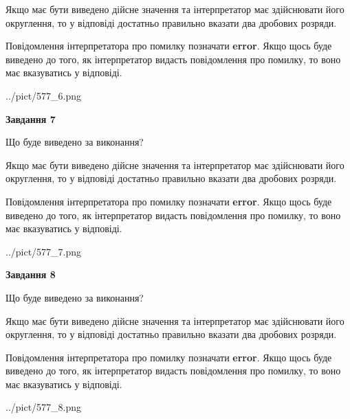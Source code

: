 \documentclass[12pt, ukrainian]{article}
\begin{document}
{\begin {Large}
Якщо має бути виведено дійсне значення та інтерпретатор має здійснювати його округлення, 
то у відповіді достатньо правильно вказати два дробових розряди.

Повідомлення інтерпретатора про помилку позначати \textbf{error}.
Якщо щось буде виведено до того, як інтерпретатор видасть повідомлення про помилку, 
то воно має вказуватись у відповіді. \par

\begin{center}
	{../pict/577_6.png}
\end{center}
\newpage

{\begin {center}\textbf{Завдання 7}\end {center}}\par
Що буде виведено за виконання? \par

Якщо має бути виведено дійсне значення та інтерпретатор має здійснювати його округлення, 
то у відповіді достатньо правильно вказати два дробових розряди.

Повідомлення інтерпретатора про помилку позначати \textbf{error}.
Якщо щось буде виведено до того, як інтерпретатор видасть повідомлення про помилку, 
то воно має вказуватись у відповіді. \par

\begin{center}
	{../pict/577_7.png}
\end{center}
\newpage

{\begin {center}\textbf{Завдання 8}\end {center}}\par
Що буде виведено за виконання? \par

Якщо має бути виведено дійсне значення та інтерпретатор має здійснювати його округлення, 
то у відповіді достатньо правильно вказати два дробових розряди.

Повідомлення інтерпретатора про помилку позначати \textbf{error}.
Якщо щось буде виведено до того, як інтерпретатор видасть повідомлення про помилку, 
то воно має вказуватись у відповіді. \par

\begin{center}
	{../pict/577_8.png}
\end{center}
\newpage


\end{Large}}
\end{document}
